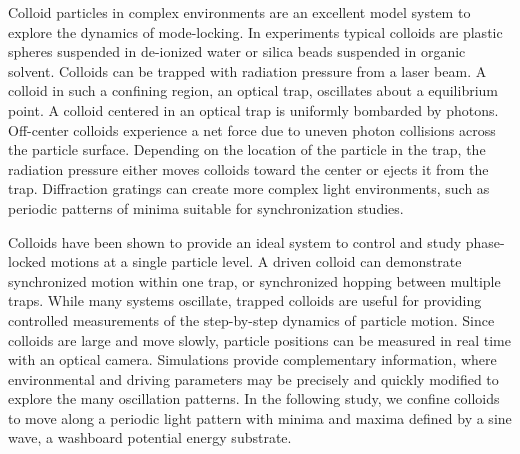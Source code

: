\documentclass[preprint,showpacs,preprintnumbers,amsmath,amssymb,aps,prb]{revtex4-1}
\theoremstyle{remark}
\begin{document}
Colloid particles in complex environments are an excellent
model system to explore %
the dynamics of mode-locking. %
In experiments %
typical colloids are   
plastic spheres suspended in
de-ionized water or silica beads suspended in organic solvent.
Colloids can be trapped
with 
radiation pressure from 
a laser beam.\cite{Ashkin1997} 
A colloid in such a confining region,
an optical trap, oscillates
about a equilibrium point.
A colloid centered in an optical trap is 
uniformly bombarded by photons. 
Off-center colloids 
experience a net force
due to uneven photon collisions across
the particle surface.
Depending on the 
location of the particle in the trap,
the radiation pressure either moves colloids toward the center 
or ejects it from the trap.
Diffraction gratings can create
more complex light environments, 
such as periodic patterns of minima
suitable for synchronization studies.\cite{Grier2003}

Colloids have been
shown to 
provide an ideal system to 
control and study
phase-locked motions
at a single particle level.\cite{Juniper2015,Juniper2017}
A driven colloid
can demonstrate
synchronized
motion within one trap,
or synchronized hopping between multiple traps. 
While many systems oscillate,
trapped colloids are useful for 
providing controlled 
measurements of the
step-by-step dynamics of particle motion.
Since
colloids are large 
and move slowly, 
particle positions 
can be measured in real time 
with an optical camera.\cite{Pertsinidis2001}
Simulations provide complementary
information,
where environmental and driving parameters may be precisely
and quickly modified to explore
the many oscillation patterns.
In the following study,
we confine colloids  
to move along a periodic light pattern
with minima and maxima defined by a sine wave,
a washboard potential energy substrate.
\end{document}
